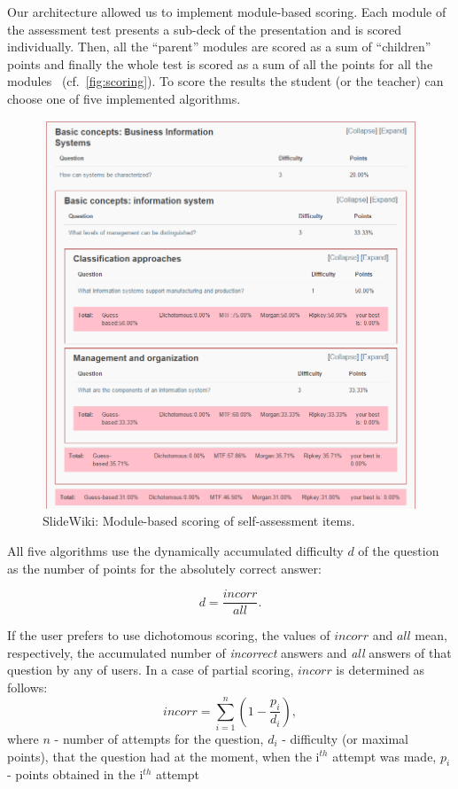 \documentclass[PhD, Submit, ngerman,UKenglish,table]{scrbook}
\begin{document}
Our architecture allowed us to implement module-based scoring.
Each module of the assessment test presents a sub-deck of the presentation and is scored individually.
Then, all the ``parent'' modules are scored as a sum of ``children'' points and finally the whole test is scored as a sum of all the points for all the modules ~(cf.~\autoref{fig:scoring}).
To score the results the student (or the teacher) can choose one of five implemented algorithms.

\begin{figure}[h!]
	\centering
		\includegraphics[width=\columnwidth]{images/scoring.png}
	\caption{SlideWiki: Module-based scoring of self-assessment items.}
	\label{fig:scoring}
\end{figure}

All five algorithms use the dynamically accumulated difficulty $d$ of the question as the number of points for the absolutely correct answer:

\begin{equation}
d = \frac{incorr}{all}.
\end{equation}

If the user prefers to use dichotomous scoring, the values of $incorr$ and $all$ mean, respectively, the accumulated number of \textit{incorrect} answers and \textit{all} answers of that question by any of users.
In a case of partial scoring, $incorr$ is determined as follows:
\begin{equation}
incorr = \sum \limits_{i=1}^n(1 - \frac{p_{i}}{d_{i}}) ,
\end{equation}
where $n$ - number of attempts for the question,
$d_{i}$ - difficulty (or maximal points), that the question had at the moment, when the i$ ^{th}$ attempt was made, $p_{i}$ - points obtained in the i$ ^{th}$ attempt
\end{document}
